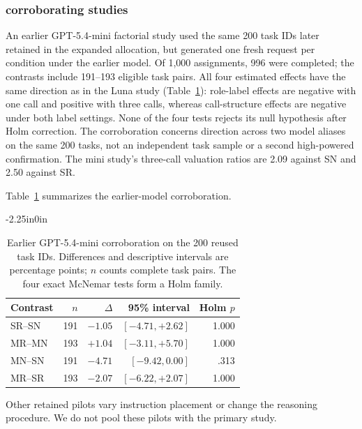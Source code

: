 \documentclass[10pt,letterpaper]{article}
\begin{document}
\subsubsection*{corroborating studies}
An earlier GPT-5.4-mini factorial study used the same 200 task IDs later retained in the expanded allocation, but generated one fresh request per condition under the earlier model. Of 1,000 assignments, 996 were completed; the contrasts include 191--193 eligible task pairs. All four estimated effects have the same direction as in the Luna study (Table~\ref{tab:mini-validation}): role-label effects are negative with one call and positive with three calls, whereas call-structure effects are negative under both label settings. None of the four tests rejects its null hypothesis after Holm correction. The corroboration concerns direction across two model aliases on the same 200 tasks, not an independent task sample or a second high-powered confirmation. The mini study's three-call valuation ratios are 2.09 against SN and 2.50 against SR.

Table~\ref{tab:mini-validation} summarizes the earlier-model corroboration.

\FloatBarrier
\begin{table}[!ht]
\begin{adjustwidth}{-2.25in}{0in}
\caption{Earlier GPT-5.4-mini corroboration on the 200 reused task IDs. Differences and descriptive intervals are percentage points; $n$ counts complete task pairs. The four exact McNemar tests form a Holm family.}
\label{tab:mini-validation}
\centering\small
\begin{tabular}{@{}lrrrr@{}}
\toprule
Contrast & $n$ & $\Delta$ & 95\% interval & Holm $p$\\
\midrule
SR--SN & 191 & $-1.05$ & $[-4.71,+2.62]$ & 1.000\\
MR--MN & 193 & $+1.04$ & $[-3.11,+5.70]$ & 1.000\\
MN--SN & 191 & $-4.71$ & $[-9.42,0.00]$ & .313\\
MR--SR & 193 & $-2.07$ & $[-6.22,+2.07]$ & 1.000\\
\bottomrule
\end{tabular}
\end{adjustwidth}
\end{table}
\FloatBarrier


Other retained pilots vary instruction placement or change the reasoning procedure. We do not pool these pilots with the primary study.
\end{document}
